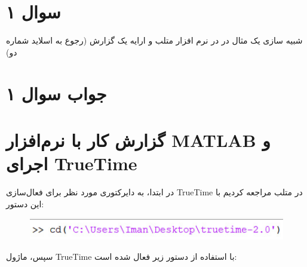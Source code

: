 \section*{سوال ۱}

شبیه سازی یک مثال
در
در نرم افزار متلب و ارایه یک گزارش (رجوع به اسلاید شماره دو)

\section*{جواب سوال ۱}

\section*{گزارش کار با نرم‌افزار MATLAB و اجرای TrueTime}

در ابتدا، به دایرکتوری مورد نظر برای فعال‌سازی TrueTime در متلب مراجعه کردیم با این دستور:
\begin{figure}[h]
	\centering
	\includegraphics{12.jpg}
	\label{fig:label4}
\end{figure}


سپس، ماژول TrueTime با استفاده از دستور زیر فعال شده است:

